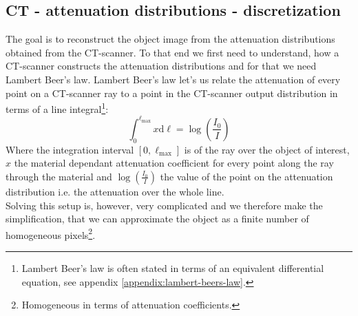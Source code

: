 \documentclass{article}
\begin{document}
\subsection{CT - attenuation distributions - discretization}\label{sec:CT-discretization}
The goal is to reconstruct the object image from the attenuation distributions obtained from the CT-scanner. To that end we first need to understand, how a CT-scanner constructs the attenuation distributions and for that we need Lambert Beer's law. Lambert Beer's law let's us relate the attenuation of every point on a CT-scanner ray to a point in the CT-scanner output distribution in terms of a line integral\footnote{Lambert Beer's law is often stated in terms of an equivalent differential equation, see appendix \ref{appendix:lambert-beers-law}.}: \\
\begin{equation}
    \int_{0}^{\ell_{\max}}x \text{d} \ell = \log\left(\frac{I_0}{I}\right)
\end{equation}
Where the integration interval $[0, \ell_{\max}]$ is of the ray over the object of interest, $x$ the material dependant attenuation coefficient for every point along the ray through the material and $\log\left(\frac{I_0}{I}\right)$ the value of the point on the attenuation distribution i.e. the attenuation over the whole line. \\
Solving this setup is, however, very complicated and we therefore make the simplification, that we can approximate the object as a finite number of homogeneous pixels\footnote{Homogeneous in terms of attenuation coefficients.}. \\
\end{document}
